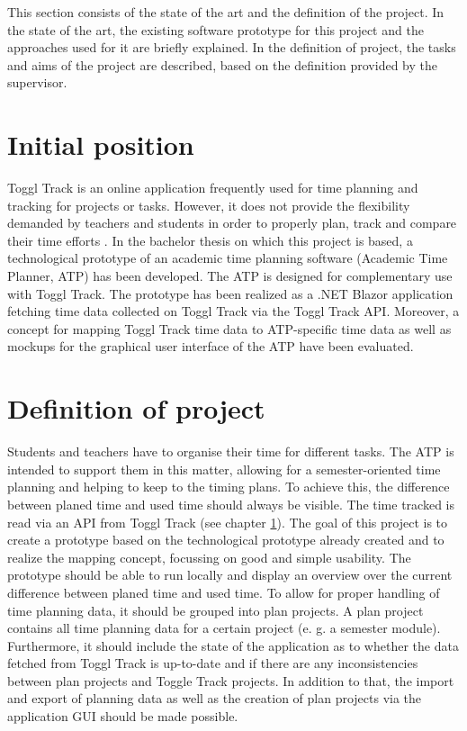 
This section consists of the state of the art and the definition of the project. In the state of the art, the existing software prototype for this project and the approaches used for it are briefly explained. In the definition of project, the tasks and aims of the project are described, based on the definition provided by the supervisor.

\section{Initial position} \label{Initial position}
Toggl Track \cite{toggl_track_url} is an online application frequently used for time planning and tracking for projects or tasks. However, it does not provide the flexibility demanded by teachers and students in order to properly plan, track and compare their time efforts \cite{bachelorarbeit_Egger_Verstappen_page2}.
In the bachelor thesis \cite{bachelorarbeit_Egger_Verstappen_page1} on which this project is based, a technological prototype of an academic time planning software (Academic Time Planner, ATP) has been developed. The ATP is designed for complementary use with Toggl Track. The prototype has been realized as a .NET Blazor application fetching time data collected on Toggl Track via the Toggl Track API. Moreover, a concept for mapping Toggl Track time data to ATP-specific time data as well as mockups for the graphical user interface of the ATP have been evaluated.

\section{Definition of project}
Students and teachers have to organise their time for different tasks. The ATP is intended to support them in this matter, allowing for a semester-oriented time planning and helping to keep to the timing plans. To achieve this, the difference between planed time and used time should always be visible.
The time tracked is read via an API from Toggl Track (see chapter \ref{Initial position}).
The goal of this project is to create a prototype based on the technological prototype already created and to realize the mapping concept, focussing on good and simple usability.
The prototype should be able to run locally and display an overview over the current difference between planed time and used time. To allow for proper handling of time planning data, it should be grouped into plan projects. A plan project contains all time planning data for a certain project (e. g. a semester module). Furthermore, it should include the state of the application as to whether the data fetched from Toggl Track is up-to-date and if there are any inconsistencies between plan projects and Toggle Track projects. In addition to that, the import and export of planning data as well as the creation of plan projects via the application GUI should be made possible.
 


